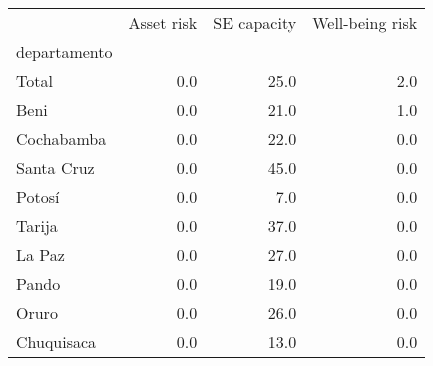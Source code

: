 \begin{tabular}{lrrr}
\toprule
{} &  Asset risk &  SE capacity &  Well-being risk \\
departamento &             &              &                  \\
\midrule
Total        &         0.0 &         25.0 &              2.0 \\
Beni         &         0.0 &         21.0 &              1.0 \\
Cochabamba   &         0.0 &         22.0 &              0.0 \\
Santa Cruz   &         0.0 &         45.0 &              0.0 \\
Potosí       &         0.0 &          7.0 &              0.0 \\
Tarija       &         0.0 &         37.0 &              0.0 \\
La Paz       &         0.0 &         27.0 &              0.0 \\
Pando        &         0.0 &         19.0 &              0.0 \\
Oruro        &         0.0 &         26.0 &              0.0 \\
Chuquisaca   &         0.0 &         13.0 &              0.0 \\
\bottomrule
\end{tabular}

